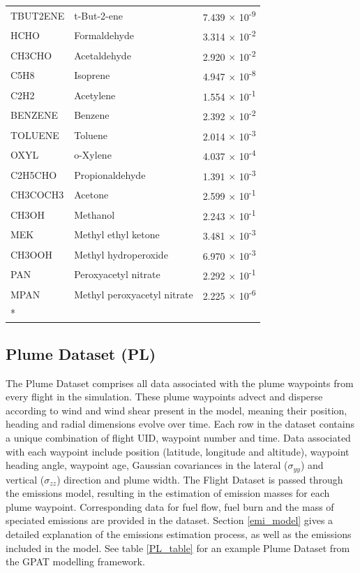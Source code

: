 \begin{longtable}[c]{@{}lll@{}}
    TBUT2ENE & t-But-2-ene                 & 7.439 $\times$ 10\textsuperscript{-9} \\
    HCHO     & Formaldehyde                & 3.314 $\times$ 10\textsuperscript{-2} \\
    CH3CHO   & Acetaldehyde                & 2.920 $\times$ 10\textsuperscript{-2} \\
    C5H8     & Isoprene                    & 4.947 $\times$ 10\textsuperscript{-8} \\
    C2H2     & Acetylene                   & 1.554 $\times$ 10\textsuperscript{-1} \\
    BENZENE  & Benzene                     & 2.392 $\times$ 10\textsuperscript{-2} \\
    TOLUENE  & Toluene                     & 2.014 $\times$ 10\textsuperscript{-3} \\
    OXYL     & o-Xylene                    & 4.037 $\times$ 10\textsuperscript{-4} \\
    C2H5CHO  & Propionaldehyde             & 1.391 $\times$ 10\textsuperscript{-3} \\
    CH3COCH3 & Acetone                     & 2.599 $\times$ 10\textsuperscript{-1} \\
    CH3OH    & Methanol                    & 2.243 $\times$ 10\textsuperscript{-1} \\
    MEK      & Methyl ethyl ketone         & 3.481 $\times$ 10\textsuperscript{-3} \\
    CH3OOH   & Methyl hydroperoxide        & 6.970 $\times$ 10\textsuperscript{-3} \\
    PAN      & Peroxyacetyl nitrate        & 2.292 $\times$ 10\textsuperscript{-1} \\
    MPAN     & Methyl peroxyacetyl nitrate & 2.225 $\times$ 10\textsuperscript{-6} \\* \bottomrule
\end{longtable}


\subsection{Plume Dataset (PL)}
The Plume Dataset comprises all data associated with the plume waypoints from every flight in the simulation. These plume waypoints advect and disperse according to wind and wind shear present in the model, meaning their position, heading and radial dimensions evolve over time. Each row in the dataset contains a unique combination of flight UID, waypoint number and time. Data associated with each waypoint include position (latitude, longitude and altitude), waypoint heading angle, waypoint age, Gaussian covariances in the lateral ($\sigma_{yy}$) and vertical ($\sigma_{zz}$) direction and plume width. The Flight Dataset is passed through the emissions model, resulting in the estimation of emission masses for each plume waypoint. Corresponding data for fuel flow, fuel burn and the mass of speciated emissions are provided in the dataset. Section \ref{emi_model} gives a detailed explanation of the emissions estimation process, as well as the emissions included in the model. See table \ref{PL_table} for an example Plume Dataset from the GPAT modelling framework.


